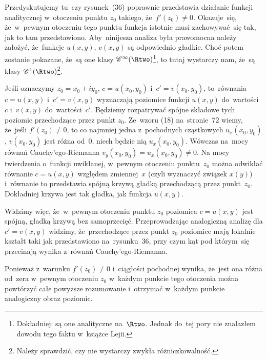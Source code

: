 \documentclass[a4paper,11pt]{article}
\begin{document}
\vspace{\spaceFour}


\start {} Przedyskutujemy tu~czy rysunek~(36) poprawnie
przedstawia działanie funkcji analitycznej w~otoczeniu punktu
$z_{ 0 }$ takiego, że~$f'( z_{ 0 } ) \neq 0$. Okazuje~się, że~w~pewnym
otoczeniu tego punktu funkcja istotnie musi zachowywać~się tak, jak to
tam przedstawiono. Aby~ninijesza analiza była prawomocna należy
założyć, że~funkcje $u( x, y )$, $v( x, y )$ są odpowiednio gładkie.
Choć potem zostanie pokazane, że~są one klasy
$\Cinfty( \Rtwo )$\footnote{Dokładniej: są one analityczne na~$\Rtwo$.
  Jednak do~tej pory nie znalazłem dowodu tego faktu w~książce
  Lejii.}, to tutaj wystarczy nam, że~są klasy
$\Cc^{ 1 }( \Rtwo )$\footnote{Należy sprawdzić, czy nie wystarczy
  zwykła różniczkowalność.}.

Jeśli oznaczymy $z_{ 0 } = x_{ 0 } + i y_{ 0 }$,
$c = u( x_{ 0 }, y_{ 0 } )$ i~$c' = v( x_{ 0 }, y_{ 0 } )$,
to~równania $c = u( x, y )$ i~$c' = v( x, y )$ wyznaczają poziomice
funkcji $u( x, y )$ do~wartości~$c$ i~$v( x, y )$ do~wartości~$c'$.
Będziemy rozpatrywać spójne składowe tych poziomic przechodzące przez
punkt $z_{ 0 }$. Ze~wzoru (18) na~stronie~72 wiemy, że~jeśli
$f'( z_{ 0 } ) \neq 0$, to co najmniej jedna z~pochodnych cząstkowych
$u_{ x }( x_{ 0 }, y_{ 0 } )$, $v( x_{ 0 }, y_{ 0 } )$ jest różna
od~0, niech będzie nią $u_{ x }( x_{ 0 }, y_{ 0 } )$. Wówczas na~mocy
równań Cauchy'ego-Riemanna
$v_{ y }( x_{ 0 }, y_{ 0 } ) = u_{ x }( x_{ 0 }, y_{ 0 } ) \neq 0$. Na
mocy twierdzenia o~funkcji uwikłanej, w~pewnym otoczeniu
punktu~$z_{ 0 }$ można odwikłać równanie $c = u( x, y )$ względem
zmiennej~$x$ (czyli wyznaczyć związek $x( y )$) i~równanie to
przedstawia spójną krzywą gładką przechodzącą przez punkt~$z_{ 0 }$.
Dokładniej krzywa jest tak gładka, jak funkcja $u( x, y )$.

Widzimy więc, że~w~pewnym otoczeniu punktu $z_{ 0 }$ poziomica
$c = u( x, y )$ jest spójną, gładką krzywą bez samoprzecięć.
Przeprowadzając analogiczną analizę dla $c' = v( x, y )$ widzimy,
że~przechodzące przez punkt $z_{ 0 }$ poziomice mają lokalnie kształt
taki jak przedstawiono na~rysunku~36, przy czym kąt pod którym~się
przecinają wynika z~równań Cauchy'ego-Riemanna.

Ponieważ z~warunku $f'( z_{ 0 } ) \neq 0$ i~ciągłości pochodnej
wynika, że~jest ona różna od~zera w~pewnym otoczeniu $z_{ 0 }$
w~każdym punkcie tego otoczenia można powtórzyć całe powyższe
rozumowanie i~otrzymać w~każdym punkcie analogiczny obraz poziomic.
\end{document}
